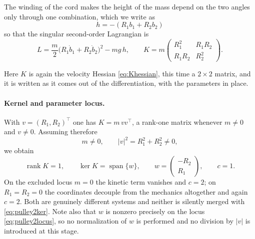 \documentclass[12pt]{article}
\theoremstyle{plain}
\theoremstyle{definition}
\theoremstyle{remark}
\DeclareMathOperator{\rank}{rank}
\DeclareMathOperator{\spn}{span}
\begin{document}
	The winding of the cord makes the height of the mass depend on the two angles
	only through one combination, which we write as
	\begin{equation}
		h=-(R_{1}b_{1}+R_{2}b_{2})
		\label{eq:pulley2h}
	\end{equation}
	so that the singular second-order Lagrangian is
	\begin{equation}
		L=\frac m2\bigl(R_{1}\dot b_{1}+R_{2}\dot b_{2}\bigr)^{2}-mg\,h,
		\qquad
		K=m\begin{pmatrix}R_{1}^{2}&R_{1}R_{2}\\ R_{1}R_{2}&R_{2}^{2}\end{pmatrix}.
		\label{eq:pulley2}
	\end{equation}
	
	Here $K$ is again the velocity Hessian \eqref{eq:Khessian}, this time a
	$2\times2$ matrix, and it is written as it comes out of the differentiation,
	with the parameters in place.
	
	\paragraph{Kernel and parameter locus.} With $v=(R_{1},R_{2})^{\top}$ one has
	$K=m\,vv^{\top}$, a rank-one matrix whenever $m\neq0$ and $v\neq0$. Assuming
	therefore
	\begin{equation}
		m\neq0,
		\qquad
		|v|^{2}=R_{1}^{2}+R_{2}^{2}\neq0,
		\label{eq:pulley2locus}
	\end{equation}
	we obtain
	\begin{equation}
		\rank K=1,
		\qquad
		\ker K=\spn\{w\},\qquad w=\begin{pmatrix}-R_{2}\\ R_{1}\end{pmatrix},
		\qquad c=1 .
		\label{eq:pulley2ker}
	\end{equation}
	On the excluded locus $m=0$ the kinetic term vanishes and $c=2$; on
	$R_{1}=R_{2}=0$ the coordinates decouple from the mechanics altogether and
	again $c=2$. Both are genuinely different systems and neither is silently
	merged with \eqref{eq:pulley2ker}. Note also that $w$ is nonzero precisely on
	the locus \eqref{eq:pulley2locus}, so no normalization of $w$ is performed and
	no division by $|v|$ is introduced at this stage.
	
\end{document}
